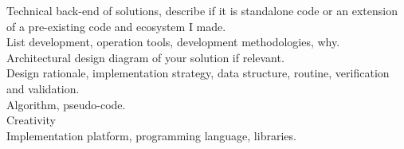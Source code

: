Technical back-end of solutions, describe if it is standalone code or an extension of a pre-existing code and ecosystem I made.\\
List development, operation tools, development methodologies, why.\\

Architectural design diagram of your solution if relevant.\\
Design rationale, implementation strategy, data structure, routine, verification and validation.\\
Algorithm, pseudo-code.\\

Creativity\\

Implementation platform, programming language, libraries.\\